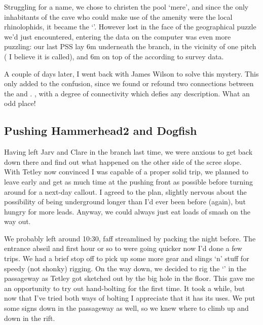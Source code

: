 	Struggling for a name, we chose to christen the pool `mere', and since the only inhabitants of the cave who could make use of the amenity were the local rhinolophids, it became the `'. However lost in the face of the geographical puzzle we'd just encountered, entering the data on the computer was even more puzzling: our last PSS lay 6m underneath the  branch, in the vicinity of one pitch ( I believe it is called), and 6m on top of the  according to survey data.
	
	A couple of days later, I went back with James Wilson to solve this mystery. This only added to the confusion, since we found or refound two connections between the  and . , with a degree of connectivity which defies any description. What an odd place!


\subsection{Pushing Hammerhead2 and Dogfish}

				 
Having left Jarv and Clare in the  branch last time, we were anxious to get back down there and find out what happened on the other side of the scree slope. With Tetley now convinced I was capable of a proper solid trip, we planned to leave early and get as much time at the pushing front as possible before turning around for a next-day callout. I agreed to the plan, slightly nervous about the possibility of being underground longer than I'd ever been before (again), but hungry for more leads. Anyway, we could always just eat loads of smash on the way out.

We probably left around 10:30, faff streamlined by packing the night before. The entrance abseil and first hour or so to  were going quicker now I'd done a few trips. We had a brief stop off to pick up some more gear and slings `n' stuff for speedy (not shonky) rigging. On the way down, we decided to rig the `' in the  passageway as Tetley got sketched out by the big hole in the floor. This gave me an opportunity to try out hand-bolting for the first time. It took a while, but now that I've tried both ways of bolting I appreciate that it has its uses. We put some signs down in the  passageway as well, so we knew where to climb up and down in the rift.

